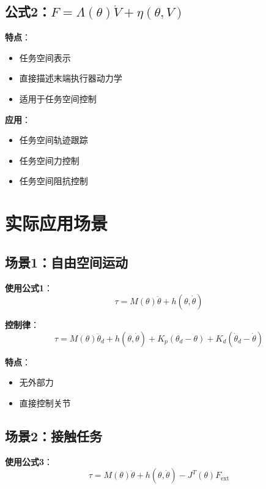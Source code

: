 \documentclass[12pt,a4paper]{article}
\begin{document}
\subsection{公式2：$F = \Lambda(\theta)\dot{V} + \eta(\theta, V)$}

\textbf{特点}：
\begin{itemize}
\item 任务空间表示
\item 直接描述末端执行器动力学
\item 适用于任务空间控制
\end{itemize}

\textbf{应用}：
\begin{itemize}
\item 任务空间轨迹跟踪
\item 任务空间力控制
\item 任务空间阻抗控制
\end{itemize}

\section{实际应用场景}

\subsection{场景1：自由空间运动}

\textbf{使用公式1}：
\begin{equation}
\tau = M(\theta)\ddot{\theta} + h(\theta, \dot{\theta})
\end{equation}

\textbf{控制律}：
\begin{equation}
\tau = M(\theta)\ddot{\theta}_d + h(\theta, \dot{\theta}) + K_p(\theta_d - \theta) + K_d(\dot{\theta}_d - \dot{\theta})
\end{equation}

\textbf{特点}：
\begin{itemize}
\item 无外部力
\item 直接控制关节
\end{itemize}

\subsection{场景2：接触任务}

\textbf{使用公式3}：
\begin{equation}
\tau = M(\theta)\ddot{\theta} + h(\theta, \dot{\theta}) - J^T(\theta)F_{\text{ext}}
\end{equation}
\end{document}
